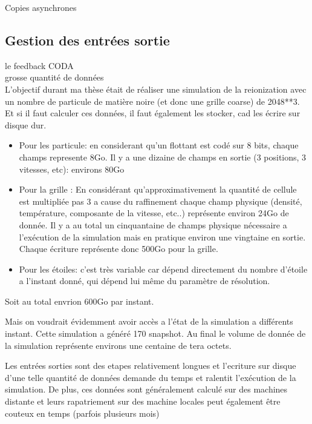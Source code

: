 Copies asynchrones




\subsection{Gestion des entrées sortie}

le feedback CODA\\
grosse quantité de données\\

L'objectif durant ma thèse était de réaliser une simulation de la reionization avec un nombre de particule de matière noire (et donc une grille coarse) de 2048**3.
Et si il faut calculer ces données, il faut également les stocker, cad les écrire sur disque dur.

\begin{itemize}

\item Pour les particule:
en considerant qu'un flottant est codé sur 8 bits, chaque champs represente 8Go.
Il y a une dizaine de champs en sortie (3 positions, 3 vitesses, etc): environs 80Go

\item Pour la grille :
En considérant qu'approximativement la quantité de cellule est multipliée pas 3 a cause du raffinement  chaque champ physique (densité, température, composante de la vitesse, etc..) représente environ 24Go de donnée.
Il y a au total un cinquantaine de champs physique nécessaire a l'exécution de la simulation mais en pratique environ une vingtaine en sortie.
Chaque écriture représente donc 500Go pour la grille.

\item Pour les étoiles:
c'est très variable car dépend directement du nombre d'étoile a l'instant donné, qui dépend lui même du paramètre de résolution.

\end{itemize}

Soit au total envrion 600Go par instant.

Mais on voudrait évidemment avoir accès a l'état de la simulation a différents instant.
Cette simulation a généré 170 snapshot.
Au final le volume de donnée de la simulation représente environs une centaine de tera octets.

Les entrées sorties sont des etapes relativement longues et l'ecriture sur disque d'une telle quantité de données demande du temps et ralentit l'exécution de la simulation.
De plus, ces données sont généralement calculé sur des machines distante et leurs rapatriement sur des machine locales peut également être couteux en temps (parfois plusieurs mois)

